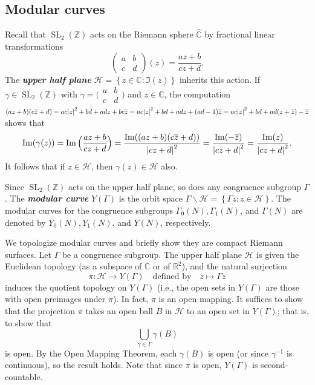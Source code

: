 \documentclass[10pt,leqno]{article}
\newcommand{\cbr}[1]{\left\{#1\right\}}
\newcommand{\textib}[1]{\textbf{\textit{#1}}}
\DeclareMathOperator{\SL}{SL}
\begin{document}
\subsection{Modular curves}
Recall that $\SL_2(\mathbb{Z})$ acts on the Riemann sphere $\widehat{\mathbb{C}}$ by fractional linear transformations \[\begin{pmatrix}
    a & b \\ c & d
\end{pmatrix}(z) = \frac{az + b}{cz+d}.\] The \textib{upper half plane} $\mathcal{H} = \cbr{z\in\mathbb{C} : \Im(z)}$ inherits this action. If $\gamma\in \SL_2(\mathbb{Z})$ with $\gamma = \big(\!\begin{smallmatrix}
    a & b \\ c & d
\end{smallmatrix}\!\big)$ and $z\in \mathbb C$, the computation $(az+b)(c\overline z + d) = ac\abs{z}^2+bd + adz + bc\overline z = ac\abs{z}^2+bd + adz + (ad-1)\overline z = ac\abs{z}^2+bd + ad(z+\overline z) -\overline z$ shows that
\begin{equation}\label{eq: imaginary parts}
    \Im(\gamma(z)) = \Im\Big(\frac{az+b}{cz+d}\Big) = \frac{\Im((az+b)(c\overline z + d))}{\abs{cz+d}^2} = \frac{\Im(-\overline z)}{\abs{cz+d}^2} = \frac{\Im(z)}{\abs{cz+d}^2}.
\end{equation}
It follows that if $z\in \mathcal{H}$, then $\gamma(z)\in \mathcal{H}$ also.

Since $\SL_2(\mathbb{Z})$ acts on the upper half plane, so does any congruence subgroup $\varGamma$. The \textib{modular curve} $Y(\varGamma)$ is the orbit space $\varGamma\backslash \mathcal{H} = \cbr{\varGamma z : z\in\mathcal H}$. The modular curves for the congruence subgroups $\varGamma_0(N), \varGamma_1(N)$, and $\varGamma(N)$ are denoted by $Y_0(N), Y_1(N)$, and $Y(N)$, respectively.

We topologize modular curves and briefly show they are compact Riemann surfaces. Let $\varGamma$ be a congruence subgroup. The upper half plane $\mathcal H$ is given the Euclidean topology (as a subspace of $\mathbb{C}$ or of $\mathbb{R}^2$), and the natural surjection \[\pi \colon \mathcal H \to Y(\varGamma)\quad \text{defined by}\quad  z\mapsto \varGamma z\] induces the quotient topology on $Y(\varGamma)$ (i.e., the open sets in $Y(\varGamma)$ are those with open preimages under $\pi$). In fact, $\pi$ is an open mapping. It suffices to show that the projection $\pi$ takes an open ball $B$ in $\mathcal{H}$ to an open set in $Y(\varGamma)$; that is, to show that \[\bigcup_{\gamma\in \varGamma}\gamma(B)\] is open. By the Open Mapping Theorem, each $\gamma(B)$ is open (or since $\gamma^{-1}$ is continuous), so the result holds. Note that since $\pi$ is open, $Y(\varGamma)$ is second-countable.
\end{document}
